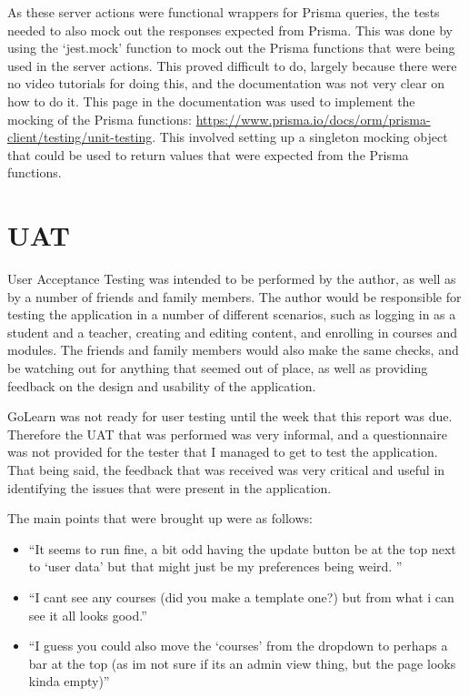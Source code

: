 \documentclass[11pt, a4paper,twoside]{report}
\theoremstyle{plain} %
\theoremstyle{definition} %
\numberwithin{equation}{chapter}
\begin{document}
As these server actions were functional wrappers for Prisma queries, the tests
needed to also mock out the responses expected from Prisma. This was done by
using the `jest.mock' function to mock out the Prisma functions that were being
used in the server actions. This proved difficult to do, largely because there
were no video tutorials for doing this, and the documentation was not very
clear on how to do it. This page in the documentation was used to implement the
mocking of the Prisma functions:
\url{https://www.prisma.io/docs/orm/prisma-client/testing/unit-testing}. This
involved setting up a singleton mocking object that could be used to return
values that were expected from the Prisma functions.

\section{UAT}\label{sec:usertesting}

User Acceptance Testing was intended to be performed by the author, as well as
by a number of friends and family members. The author would be responsible for
testing the application in a number of different scenarios, such as logging in
as a student and a teacher, creating and editing content, and enrolling in
courses and modules. The friends and family members would also make the same
checks, and be watching out for anything that seemed out of place, as well as
providing feedback on the design and usability of the application.

GoLearn was not ready for user testing until the week that this report was
due. Therefore the UAT that was performed was very informal, and a
questionnaire was not provided for the tester that I managed to get to test the
application. That being said, the feedback that was received was very critical
and useful in identifying the issues that were present in the application.

The main points that were brought up were as follows:

\begin{itemize}
    \item ``It seems to run fine, a bit odd having the update button be at the
          top next to `user data' but that might just be my preferences being
          weird. ''
    \item ``I cant see any courses (did you make a template one?) but from what
          i can see it all looks good.''
    \item ``I guess you could also move the `courses' from the dropdown to
          perhaps a bar at the top (as im not sure if its an admin view thing,
          but the page looks kinda empty)''
\end{itemize}
\end{document}
